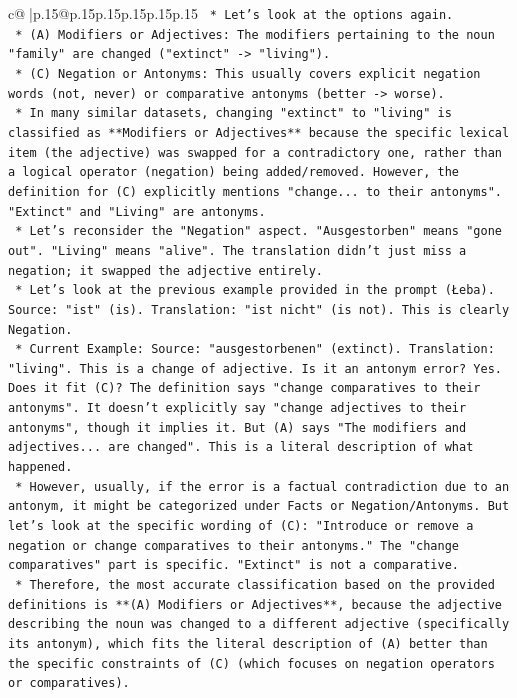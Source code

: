 \documentclass{article}
\begin{document}
{\begin{supertabular}{c@{$\;$}|p{.15\linewidth}@{}p{.15\linewidth}p{.15\linewidth}p{.15\linewidth}p{.15\linewidth}p{.15\linewidth}}
{{{\texttt{    *   Let's look at the options again.} \\
\texttt{        *   (A) Modifiers or Adjectives: The modifiers pertaining to the noun "family" are changed ("extinct" {-}> "living").} \\
\texttt{        *   (C) Negation or Antonyms: This usually covers explicit negation words (not, never) or comparative antonyms (better {-}> worse).} \\
\texttt{    *   In many similar datasets, changing "extinct" to "living" is classified as **Modifiers or Adjectives** because the specific lexical item (the adjective) was swapped for a contradictory one, rather than a logical operator (negation) being added/removed. However, the definition for (C) explicitly mentions "change... to their antonyms". "Extinct" and "Living" are antonyms.} \\
\texttt{    *   Let's reconsider the "Negation" aspect. "Ausgestorben" means "gone out". "Living" means "alive". The translation didn't just miss a negation; it swapped the adjective entirely.} \\
\texttt{    *   Let's look at the previous example provided in the prompt (Łeba). Source: "ist" (is). Translation: "ist nicht" (is not). This is clearly Negation.} \\
\texttt{    *   Current Example: Source: "ausgestorbenen" (extinct). Translation: "living". This is a change of adjective. Is it an antonym error? Yes. Does it fit (C)? The definition says "change comparatives to their antonyms". It doesn't explicitly say "change adjectives to their antonyms", though it implies it. But (A) says "The modifiers and adjectives... are changed". This is a literal description of what happened.} \\
\texttt{    *   However, usually, if the error is a factual contradiction due to an antonym, it might be categorized under Facts or Negation/Antonyms. But let's look at the specific wording of (C): "Introduce or remove a negation or change comparatives to their antonyms." The "change comparatives" part is specific. "Extinct" is not a comparative.} \\
\texttt{    *   Therefore, the most accurate classification based on the provided definitions is **(A) Modifiers or Adjectives**, because the adjective describing the noun was changed to a different adjective (specifically its antonym), which fits the literal description of (A) better than the specific constraints of (C) (which focuses on negation operators or comparatives).} \\
}}}
\end{supertabular}}
\end{document}
